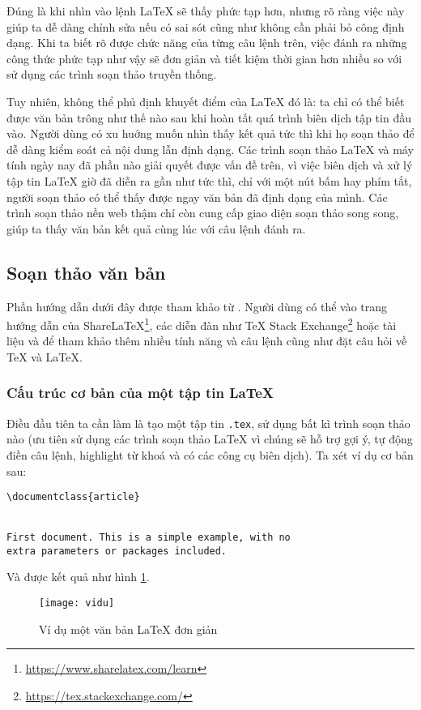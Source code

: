 Đúng là khi nhìn vào lệnh LaTeX sẽ thấy phức tạp hơn, nhưng rõ ràng việc này giúp ta dễ dàng chỉnh sửa
nếu có sai sót cũng như không cần phải bỏ công định dạng. Khi ta biết rõ được chức năng của từng câu lệnh trên, việc
đánh ra những công thức phức tạp như vậy sẽ đơn giản và tiết kiệm thời gian hơn nhiều so với sử dụng
các trình soạn thảo truyền thống.\par
Tuy nhiên, không thể phủ định khuyết điểm của LaTeX đó là: ta chỉ có thể biết được văn bản trông như
thế nào sau khi hoàn tất quá trình biên dịch tập tin đầu vào. Người dùng có xu huớng muốn nhìn thấy kết
quả tức thì khi họ soạn thảo để dễ dàng kiểm soát cả nội dung lẫn định dạng. Các trình soạn thảo 
LaTeX và máy tính ngày nay đã phần nào giải quyết được vấn đề trên, vì việc biên dịch và xử lý
tập tin LaTeX giờ đã diễn ra gần như tức thì, chỉ với một nút bấm hay phím tắt, người soạn thảo có
thể thấy được ngay văn bản đã định dạng của mình. Các trình soạn thảo nền web thậm chí còn cung cấp giao
diện soạn thảo song song, giúp ta thấy văn bản kết quả cùng lúc với câu lệnh đánh ra.\par
\subsection{Soạn thảo văn bản}\label{subsec:2.2.2}
Phần hướng dẫn dưới đây được tham khảo từ \cite{sharelatex}. Người dùng có thể vào trang hướng dẫn
của ShareLaTeX\footnote{\url{https://www.sharelatex.com/learn}}, các diễn đàn như TeX Stack Exchange\footnote{\url{https://tex.stackexchange.com/}} 
hoặc tài liệu \cite{lamport} và \cite{latex-comp} để tham khảo thêm nhiều tính năng và câu lệnh cũng như đặt câu hỏi về TeX và LaTeX.\par
\subsubsection*{Cấu trúc cơ bản của một tập tin \LaTeX}
Điều đầu tiên ta cần làm là tạo một tập tin \verb=.tex=, sử dụng bất kì trình soạn thảo nào (ưu tiên sử dụng các trình soạn thảo
LaTeX vì chúng sẽ hỗ trợ gợi ý, tự động điền câu lệnh, highlight từ khoá và có các công cụ biên dịch).
Ta xét ví dụ cơ bản sau:\par
\begin{verbatim}
\documentclass{article}
 

First document. This is a simple example, with no 
extra parameters or packages included.

\end{verbatim}
Và được kết quả như hình \ref{fig:vidu}.\par
\begin{figure}[H]
 \centering
 \texttt{[image: vidu]}
 \caption{Ví dụ một văn bản LaTeX đơn giản}
 \label{fig:vidu}
\end{figure}


